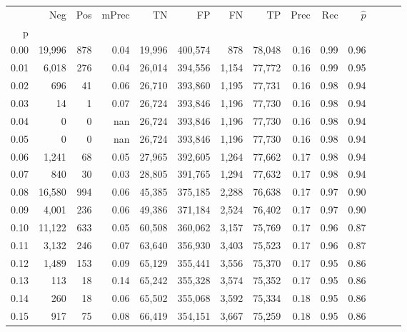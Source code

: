 \begin{tabular}{rrrrrrrrrrrrrr}
\toprule
{} &     Neg &    Pos & mPrec &       TN &       FP &      FN &      TP &  Prec &   Rec & $\hat{p}$ \\
p    &         &        &       &          &          &         &         &       &       &           \\
\midrule
0.00 &  19,996 &    878 &  0.04 &   19,996 &  400,574 &     878 &  78,048 &  0.16 &  0.99 &      0.96 \\
0.01 &   6,018 &    276 &  0.04 &   26,014 &  394,556 &   1,154 &  77,772 &  0.16 &  0.99 &      0.95 \\
0.02 &     696 &     41 &  0.06 &   26,710 &  393,860 &   1,195 &  77,731 &  0.16 &  0.98 &      0.94 \\
0.03 &      14 &      1 &  0.07 &   26,724 &  393,846 &   1,196 &  77,730 &  0.16 &  0.98 &      0.94 \\
0.04 &       0 &      0 &   nan &   26,724 &  393,846 &   1,196 &  77,730 &  0.16 &  0.98 &      0.94 \\
0.05 &       0 &      0 &   nan &   26,724 &  393,846 &   1,196 &  77,730 &  0.16 &  0.98 &      0.94 \\
0.06 &   1,241 &     68 &  0.05 &   27,965 &  392,605 &   1,264 &  77,662 &  0.17 &  0.98 &      0.94 \\
0.07 &     840 &     30 &  0.03 &   28,805 &  391,765 &   1,294 &  77,632 &  0.17 &  0.98 &      0.94 \\
0.08 &  16,580 &    994 &  0.06 &   45,385 &  375,185 &   2,288 &  76,638 &  0.17 &  0.97 &      0.90 \\
0.09 &   4,001 &    236 &  0.06 &   49,386 &  371,184 &   2,524 &  76,402 &  0.17 &  0.97 &      0.90 \\
0.10 &  11,122 &    633 &  0.05 &   60,508 &  360,062 &   3,157 &  75,769 &  0.17 &  0.96 &      0.87 \\
0.11 &   3,132 &    246 &  0.07 &   63,640 &  356,930 &   3,403 &  75,523 &  0.17 &  0.96 &      0.87 \\
0.12 &   1,489 &    153 &  0.09 &   65,129 &  355,441 &   3,556 &  75,370 &  0.17 &  0.95 &      0.86 \\
0.13 &     113 &     18 &  0.14 &   65,242 &  355,328 &   3,574 &  75,352 &  0.17 &  0.95 &      0.86 \\
0.14 &     260 &     18 &  0.06 &   65,502 &  355,068 &   3,592 &  75,334 &  0.18 &  0.95 &      0.86 \\
0.15 &     917 &     75 &  0.08 &   66,419 &  354,151 &   3,667 &  75,259 &  0.18 &  0.95 &      0.86 \\

\end{tabular}
